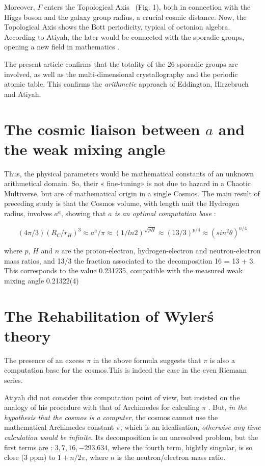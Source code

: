 \documentclass[a4paper,9pt]{article}
\begin{document}
   
     Moreover, $\Gamma$ enters the Topological Axis \cite{Sanchez} \ (Fig. 1), both in connection with the Higgs boson and the galaxy group radius, a crucial cosmic distance. Now, the Topological Axis shows the Bott periodicity, typical of octonion algebra. According to Atiyah, the later would be connected with the sporadic groups, opening a new field in mathematics \cite{Atiyah1}.
     
     
     The present article confirms that the totality of the 26 sporadic groups are involved, as well as the multi-dimensional crystallography and the periodic atomic table. This confirms the \textit {arithmetic} approach of Eddington, Hirzebruch and Atiyah.

\section{The cosmic liaison between $a$ and the weak mixing angle}

Thus, the physical parameters would be mathematical constants of an unknown arithmetical domain. So, their « fine-tuning» is not due to hazard in a Chaotic Multiverse, but are of mathematical origin in a single Cosmos. The main result of preceding study is that the Cosmos volume, with length unit the Hydrogen radius, involves $a^a$, showing that \textit{$a$ is an optimal computation base}  \cite{Sanchez}:

\begin{equation}
    (4\pi /3) (R_C/r_H)^3 \approx a^a/\pi \approx (1/ln2)^{\sqrt{pH}} \approx (13/3)^{p/4} \approx (sin^2\theta)^{n/4} 
\end{equation}

where $p$, $H$ and $n$ are the proton-electron, hydrogen-electron and neutron-electron mass ratios, and 13/3 the fraction associated to the decomposition 16 = 13 + 3. This corresponds to the value 0.231235, compatible with the measured weak mixing angle 0.21322(4) \cite{Tanabashi}
  
\section{The Rehabilitation of Wyler\'s theory}
The presence of an excess $\pi$ in the above formula suggests that $\pi$ is also a computation base for the cosmos.This is indeed the case in the even Riemann series.


Atiyah did not consider this computation point of view, but insisted on the analogy of his procedure with that of Archimedes for calculing $\pi$ \cite{Atiyah}. But, \textit {in the hypothesis that the cosmos is a computer}, the cosmos cannot use the mathematical Archimedes constant $\pi$, which is an idealisation, \textit {otherwise any time calculation would be infinite}. Its decomposition is an unresolved problem, but the first terms are : $3, 7, 16, -293.634$, where the fourth term, hightly singular, is so close (3 ppm) to $1 + n/2\pi$, where $n$ is the neutron/electron mass ratio.
\end{document}
